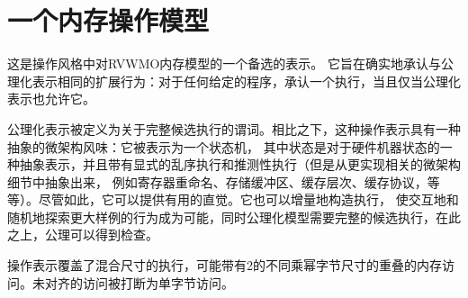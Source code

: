 \section{一个内存操作模型}
\label{sec:operational}
这是操作风格中对RVWMO内存模型的一个备选的表示。
它旨在确实地承认与公理化表示相同的扩展行为：对于任何给定的程序，承认一个执行，当且仅当公理化表示也允许它。
%

公理化表示被定义为关于完整候选执行的谓词。相比之下，这种操作表示具有一种抽象的微架构风味：它被表示为一个状态机，
其中状态是对于硬件机器状态的一种抽象表示，并且带有显式的乱序执行和推测性执行（但是从更实现相关的微架构细节中抽象出来，
例如寄存器重命名、存储缓冲区、缓存层次、缓存协议，等等）。尽管如此，它可以提供有用的直觉。它也可以增量地构造执行，
使交互地和随机地探索更大样例的行为成为可能，同时公理化模型需要完整的候选执行，在此之上，公理可以得到检查。

操作表示覆盖了混合尺寸的执行，可能带有2的不同乘幂字节尺寸的重叠的内存访问。未对齐的访问被打断为单字节访问。

